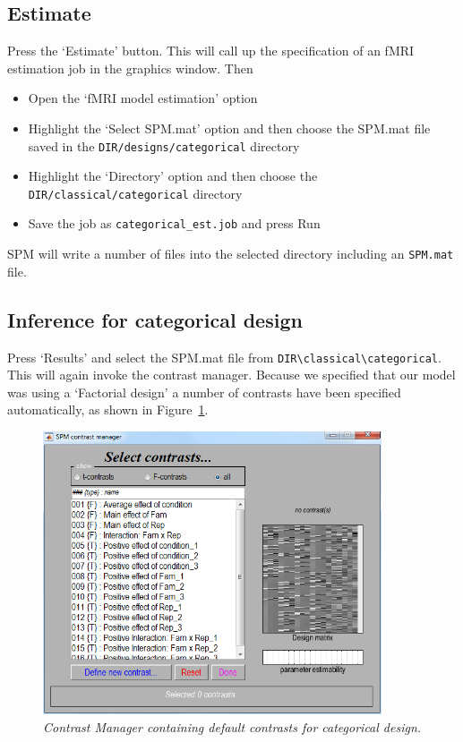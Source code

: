 \documentclass[a4paper,titlepage]{book}
\newcommand{\bi}{\begin{itemize}}
\newcommand{\ei}{\end{itemize}}
\begin{document}
\subsection{Estimate}

Press the `Estimate' button. This will call up the specification of an fMRI estimation job in the graphics window. Then
\bi
\item{Open the `fMRI model estimation' option}
\item{Highlight the `Select SPM.mat' option and then choose the SPM.mat
file saved in the \verb!DIR/designs/categorical! directory}
\item{Highlight the `Directory' option and then choose the 
\verb!DIR/classical/categorical! directory}
\item{Save the job as \verb!categorical_est.job! and press Run}
\ei
SPM will write a number of files into the selected directory including 
an \verb!SPM.mat! file.

\subsection{Inference for categorical design}

Press `Results' and select the SPM.mat file from 
\verb!DIR\classical\categorical!. This will again invoke the contrast manager. Because we specified that 
our model was using a `Factorial design' a number of 
contrasts have been specified automatically, as shown 
in Figure~\ref{cat_contrasts}.
\begin{figure}
\begin{center}
\includegraphics[width=100mm]{cat_contrasts}
\caption{\em Contrast Manager containing default contrasts for categorical design. \label{cat_contrasts}}
\end{center}
\end{figure}
\end{document}
